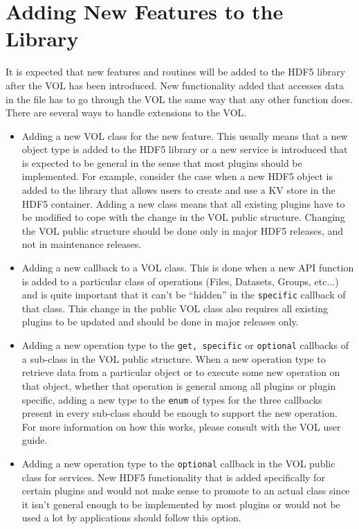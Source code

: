 
\section{Adding New Features to the Library}
It is expected that new features and routines will be added to the HDF5 library after the VOL has been introduced. New functionality added that accesses data in the file has to go through the VOL the same way that any other function does. There are several ways to handle extensions to the VOL.

\begin{itemize}
\item Adding a new VOL class for the new feature. This usually means that a new object type is added to the HDF5 library or a new service is introduced that is expected to be general in the sense that most plugins should be implemented. For example, consider the case when a new HDF5 object is added to the library that allows users to create and use a KV store in the HDF5 container. Adding a new class means that all existing plugins have to be modified to cope with the change in the VOL public structure. Changing the VOL public structure should be done only in major HDF5 releases, and not in maintenance releases.

\item Adding a new callback to a VOL class. This is done when a new API function is added to a particular class of operations (Files, Datasets, Groups, etc...) and is quite important that it can't be ``hidden'' in the {\tt specific} callback of that class. This change in the public VOL class also requires all existing plugins to be updated and should be done in major releases only.

\item Adding a new operation type to the {\tt get, specific} or {\tt optional} callbacks of a sub-class in the VOL public structure. When a new operation type to retrieve data from a particular object or to execute some new operation on that object, whether that operation is general among all plugins or plugin specific, adding a new type to the {\tt enum} of types for the three callbacks present in every sub-class should be enough to support the new operation. For more information on how this works, please consult with the VOL user guide.

\item Adding a new operation type to the {\tt optional} callback in the VOL public class for services. New HDF5 functionality that is added specifically for certain plugins and would not make sense to promote to an actual class since it isn't general enough to be implemented by most plugins or would not be used a lot by applications should follow this option. 

\end{itemize}
